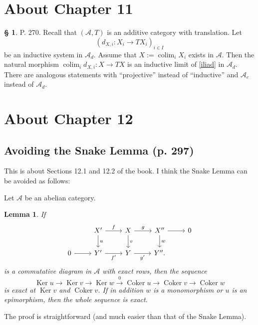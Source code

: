 \documentclass[12pt]{article}
\newtheorem{lem}[thm]{Lemma}
\theoremstyle{remark}
\theoremstyle{definition}
\newtheorem{s}[thm]{\S}
\newcommand{\A}{\mathcal A}
\newcommand{\xr}{\xrightarrow}
\DeclareMathOperator*{\co}{colim}
\DeclareMathOperator{\Coker}{Coker}
\DeclareMathOperator{\Ker}{Ker}
\begin{document}
\section{About Chapter 11}
%
%
\begin{s}\label{pg270} 
P. 270. Recall that $(\A,T)$ is an additive category with translation. Let 
\begin{equation}\label{iliad}
(d_{X,i}:X_i\to TX_i)_{i\in I}
\end{equation} 
be an inductive system in $\A_d$. Assume that $X:=\co_iX_i$ exists in $\A$. Then the natural morphism $\co_id_{X,i}:X\to TX$ is an inductive limit of \eqref{iliad} in $\A_d$. There are analogous statements with ``projective'' instead of ``inductive'' and $\A_c$ instead of $\A_d$.
\end{s}
%
%
\section{About Chapter 12}
%
\subsection{Avoiding the Snake Lemma (p. 297)} %
%
This is about Sections 12.1 and 12.2 of the book. I think the Snake Lemma can be avoided as follows: 

Let $\A$ be an abelian category. 
%
\begin{lem}\label{sl1}
If 
$$
\begin{tikzcd}
{}&X'\ar{d}{u}\ar{r}{f}&X\ar{d}{v}\ar{r}{g}&X''\ar{d}{w}\ar{r}&0\\ 
0\ar{r}&Y'\ar{r}[swap]{f'}&Y\ar{r}[swap]{g'}&Y''.
\end{tikzcd}
$$ 
is a commutative diagram in $\A$ with exact rows, then the sequence 
$$
\Ker u\to\Ker v\to\Ker w\xr0\Coker u\to\Coker v\to\Coker w
$$
is exact at $\Ker v$ and $\Coker v$. If in addition $w$ is a monomorphism or $u$ is an epimorphism, then the whole sequence is exact.
\end{lem}
%
The proof is straightforward (and much easier than that of the Snake Lemma). 
\end{document}
